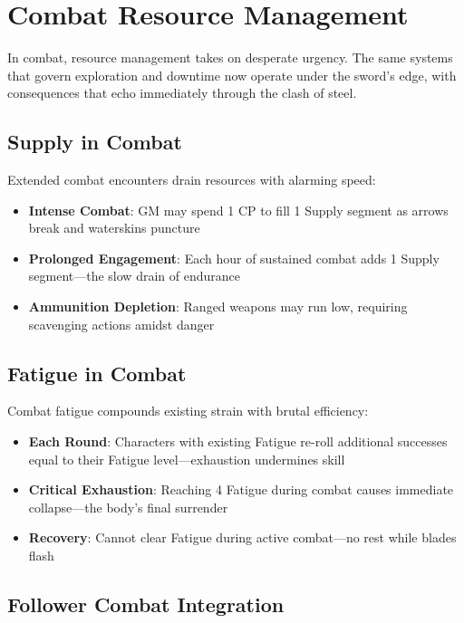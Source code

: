 \section*{Combat Resource Management}

In combat, resource management takes on desperate urgency. The same systems that govern exploration and downtime now operate under the sword's edge, with consequences that echo immediately through the clash of steel.

\subsection*{Supply in Combat}

Extended combat encounters drain resources with alarming speed:

\begin{itemize}
    \item \textbf{Intense Combat}: GM may spend 1 CP to fill 1 Supply segment as arrows break and waterskins puncture
    \item \textbf{Prolonged Engagement}: Each hour of sustained combat adds 1 Supply segment—the slow drain of endurance
    \item \textbf{Ammunition Depletion}: Ranged weapons may run low, requiring scavenging actions amidst danger
\end{itemize}

\subsection*{Fatigue in Combat}

Combat fatigue compounds existing strain with brutal efficiency:

\begin{itemize}
    \item \textbf{Each Round}: Characters with existing Fatigue re-roll additional successes equal to their Fatigue level—exhaustion undermines skill
    \item \textbf{Critical Exhaustion}: Reaching 4 Fatigue during combat causes immediate collapse—the body's final surrender
    \item \textbf{Recovery}: Cannot clear Fatigue during active combat—no rest while blades flash
\end{itemize}

\subsection*{Follower Combat Integration}

